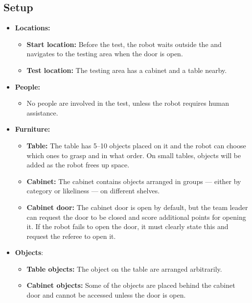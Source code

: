 \subsection*{Setup}
\begin{itemize}
	\item \textbf{Locations:}
		\begin{itemize}
			\item \textbf{Start location:} Before the test, the robot waits outside the \Arena{} and navigates to the testing area when the door is open.
			\item \textbf{Test location:} The testing area has a cabinet and a table nearby.
		\end{itemize}
	\item \textbf{People:}
		\begin{itemize}
			\item No people are involved in the test, unless the robot requires human assistance.
		\end{itemize}
	\item \textbf{Furniture:}
		\begin{itemize}
			\item \textbf{Table:} The table has 5--10 objects placed on it and the robot can choose which ones to grasp and in what order. On small tables, objects will be added as the robot frees up space.
			\item \textbf{Cabinet:} The cabinet contains objects arranged in groups --- either by category or likeliness --- on different shelves.
			\item \textbf{Cabinet door:} The cabinet door is open by default, but the team leader can request the door to be closed and score additional points for opening it. If the robot fails to open the door, it must clearly state this and request the referee to open it.
		\end{itemize}
	\item \textbf{Objects}:
		\begin{itemize}
			\item \textbf{Table objects:} The object on the table are arranged arbitrarily.
			\item \textbf{Cabinet objects:} Some of the objects are placed behind the cabinet door and cannot be accessed unless the door is open.
		\end{itemize}
\end{itemize}


